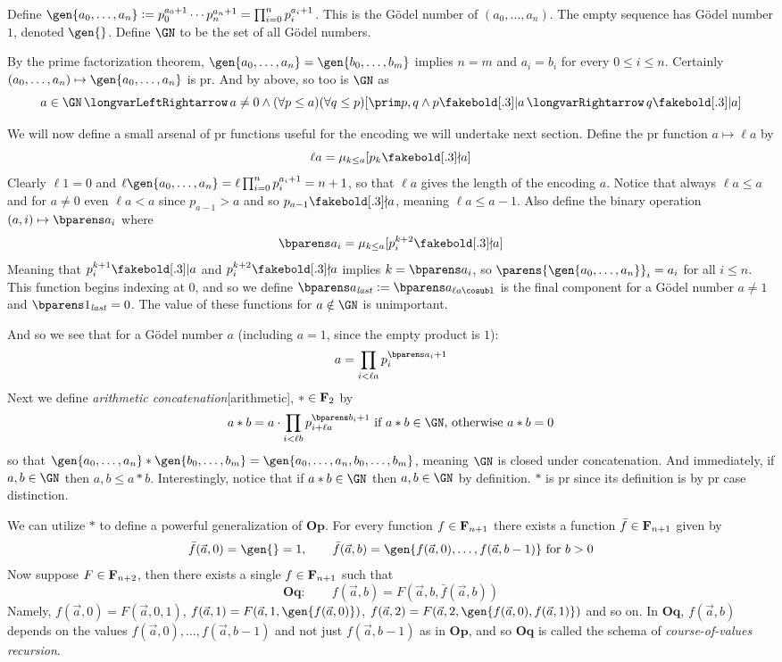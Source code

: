     Define $\gen{a_0,\dots,a_n}\coloneqq p_0^{a_0+1}\cdots p_n^{a_n+1}=\prod_{i=0}^np_i^{a_i+1}$.
    This is the {\emphcolor G\"odel number} of $(a_0,\dots,a_n)$.
    The empty sequence has G\"odel number $1$, denoted $\gen{}$.
    Define $\GN$ to be the set of all G\"odel numbers.

\edefn

By the prime factorization theorem, $\gen{a_0,\dots,a_n}=\gen{b_0,\dots,b_m}$ implies $n=m$ and $a_i=b_i$ for every $0\leq i\leq n$.
Certainly $(a_0,\dots,a_n)\mapsto\gen{a_0,\dots,a_n}$ is pr.
And by above, so too is $\GN$ as
$$ a\in\GN \iff a\neq0\land(\forall p\leq a)(\forall q\leq p)[\prim p,q\land p\bdivs a\implies q\bdivs a] $$

We will now define a small arsenal of pr functions useful for the encoding we will undertake next section.
Define the pr function $a\mapsto\ell a$ by
$$ \ell a=\mu_{k\leq a}[p_k\bndivs a] $$
Clearly $\ell1=0$ and $\ell\gen{a_0,\dots,a_n}=\ell\prod_{i=0}^np_i^{a_i+1}=n+1$, so that $\ell a$ gives the length of the encoding $a$.
Notice that always $\ell a\leq a$ and for $a\neq0$ even $\ell a<a$ since $p_{a-1}>a$ and so $p_{a-1}\bndivs a$, meaning $\ell a\leq a-1$.
Also define the binary operation $(a,i)\mapsto\bparens a_i$ where
$$ \bparens a_i = \mu_{k\leq a}[p_i^{k+2}\bndivs a] $$
Meaning that $p_i^{k+1}\bdivs a$ and $p_i^{k+2}\bndivs a$ implies $k=\bparens a_i$, so $\parens{\gen{a_0,\dots,a_n}}_i=a_i$ for all $i\leq n$.
This function begins indexing at $0$, and so we define $\bparens a_{\it last}\coloneqq\bparens a_{\ell a\cosub1}$ is the final component for a G\"odel number $a\neq1$ and $\bparens1_{\it last}=0$.
The value of these functions for $a\notin\GN$ is unimportant.

And so we see that for a G\"odel number $a$ (including $a=1$, since the empty product is $1$):
$$ a = \prod_{i<\ell a}p_i^{\bparens a_i+1} $$
Next we define {\it arithmetic concatenation}[arithmetic], $*\in{\bf F}_2$ by
$$ a*b = a\cdot\prod_{i<\ell b}p_{i+\ell a}^{\bparens b_i+1} \hbox{ if $a*b\in\GN$, otherwise } a*b = 0 $$
so that $\gen{a_0,\dots,a_n}*\gen{b_0,\dots,b_m}=\gen{a_0,\dots,a_n,b_0,\dots,b_m}$, meaning $\GN$ is closed under concatenation.
And immediately, if $a,b\in\GN$ then $a,b\leq a*b$.
Interestingly, notice that if $a*b\in\GN$ then $a,b\in\GN$ by definition.
$*$ is pr since its definition is by pr case distinction.

We can utilize $*$ to define a powerful generalization of $\boldsymbol{Op}$.
For every function $f\in{\bf F}_{n+1}$ there exists a function $\bar f\in{\bf F}_{n+1}$ given by
$$ \bar f(\vec a,0) = \gen{} = 1,\qquad \bar f(\vec a,b) = \gen{f(\vec a,0),\dots,f(\vec a,b-1)}\hbox{ for $b>0$} $$
Now suppose $F\in{\bf F}_{n+2}$, then there exists a single $f\in{\bf F}_{n+1}$ such that
$$ \boldsymbol{Oq}:\qquad f(\vec a,b) = F(\vec a,b,\bar f(\vec a,b)) $$
Namely, $f(\vec a,0)=F(\vec a,0,1)$, $f(\vec a,1)=F(\vec a,1,\gen{f(\vec a,0)})$, $f(\vec a,2)=F(\vec a,2,\gen{f(\vec a,0),f(\vec a,1)})$ and so on.
In $\boldsymbol{Oq}$, $f(\vec a,b)$ depends on the values $f(\vec a,0),\dots,f(\vec a,b-1)$ and not just $f(\vec a,b-1)$ as in $\boldsymbol{Op}$, and so $\boldsymbol{Oq}$ is called the schema of
{\it course-of-values recursion}.

